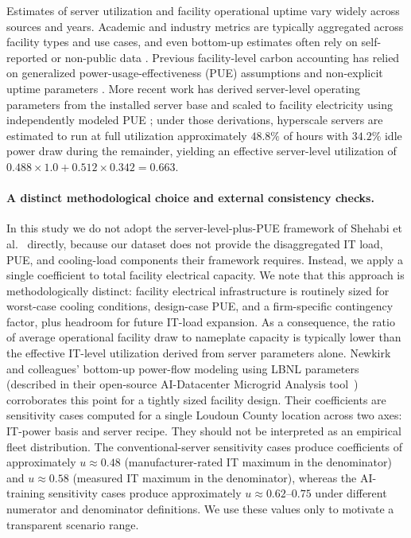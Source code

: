 \documentclass[12pt]{article}
\begin{document}
Estimates of server utilization and facility operational uptime vary widely
across sources and years. Academic and industry metrics are typically
aggregated across facility types and use cases, and even bottom-up estimates
often rely on self-reported or non-public data
\cite{mytton2022estimates}. Previous facility-level carbon accounting has
relied on generalized power-usage-effectiveness (PUE) assumptions and
non-explicit uptime parameters \cite{siddik2021environmental}. More recent
work has derived server-level operating parameters from the installed server
base and scaled to facility electricity using independently modeled PUE
\cite{Shehabi2024DataCenter,Shehabi2016DataCenter}; under those derivations,
hyperscale servers are estimated to run at full utilization approximately
$48.8\%$ of hours with $34.2\%$ idle power draw during the remainder, yielding
an effective server-level utilization of
$0.488 \times 1.0 + 0.512 \times 0.342 = 0.663$.

\paragraph{A distinct methodological choice and external consistency checks.}
In this study we do not adopt the server-level-plus-PUE framework of Shehabi et al.~\cite{Shehabi2024DataCenter,Shehabi2016DataCenter} directly, because our dataset does not provide the disaggregated IT load, PUE, and cooling-load components their framework requires. Instead, we apply a single coefficient to total facility electrical capacity. We note that this approach is methodologically distinct: facility electrical infrastructure is routinely
sized for worst-case cooling conditions, design-case PUE, and a firm-specific contingency factor, plus headroom for future IT-load expansion. As a consequence, the ratio of average operational facility draw to nameplate
capacity is typically lower than the effective IT-level utilization derived from server parameters alone. Newkirk and colleagues' bottom-up power-flow modeling using LBNL parameters (described in their open-source AI-Datacenter
Microgrid Analysis tool~\cite{newkirk2024microgrid}) corroborates this point for a tightly sized facility design. Their coefficients are sensitivity cases computed for a single Loudoun County location across two axes: IT-power basis and server recipe. They should not be interpreted as an empirical fleet distribution. The conventional-server sensitivity cases produce coefficients of approximately $u \approx 0.48$ (manufacturer-rated IT maximum in the denominator) and $u \approx 0.58$ (measured IT maximum in the denominator), whereas the AI-training sensitivity cases produce approximately $u \approx 0.62$--$0.75$ under different numerator and denominator definitions. We use these values only to motivate a transparent scenario range.
\end{document}
